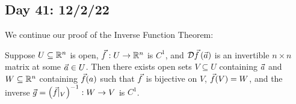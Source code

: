 \documentclass[main.tex]{subfiles}
\begin{document}
\subsection{Day 41: 12/2/22}

We continue our proof of the Inverse Function Theorem:

\begin{theorem}
    Suppose $U\subseteq \mathbb R^n$ is open, $\vec{f} : U \to \mathbb R^n$ is $C^1$, and $\mathcal{D}\vec{f}\left( \vec{a} \right)$ is an invertible $n\times n$ matrix at some $\vec{a}\in U$. Then there exists open sets $V\subseteq U$ containing $\vec{a}$ and $W\subseteq \mathbb R^n$ containing $\vec{f}(a)$ such that $\vec{f}$ is bijective on $V$, $\vec{f}(V) = W$, and the inverse $\vec{g} = \left( \vec{f} |_V \right)^{-1} : W \to V$ is $C^1$.
\end{theorem}
\end{document}
